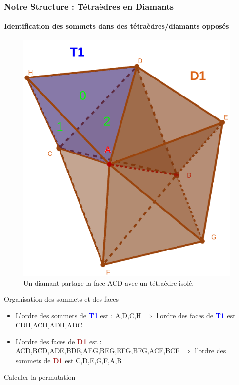 \documentclass[9pt]{beamer}
\begin{document}
\begin{frame}
\frametitle{Notre Structure : Tétraèdres en Diamants}
\framesubtitle{Identification des sommets dans des tétraèdres/diamants opposés}
\begin{figure}[H]
\centering
\includegraphics[scale=0.14]{Images/permut2}
\caption{Un diamant partage la face ACD avec un tétraèdre isolé. }
\end{figure}
\scriptsize
\begin{block}{Organisation des sommets et des faces}
\begin{itemize}
\item L'ordre des sommets de \textcolor{blue}{\textbf{T1}} est : A,D,C,H \textbf{$\Rightarrow$} l'ordre des faces de \textcolor{blue}{\textbf{T1}} est CDH,ACH,ADH,ADC
\item L'ordre des faces de \textcolor{brown}{\textbf{D1}} est : ACD,BCD,ADE,BDE,AEG,BEG,EFG,BFG,ACF,BCF \textbf{$\Rightarrow$} l'ordre des sommets de \textcolor{brown}{\textbf{D1}} est C,D,E,G,F,A,B
\end{itemize}
\end{block}
\begin{block}{Calculer la permutation}
\begin{itemize}

\end{itemize}
\end{block}
\end{frame}
\end{document}
